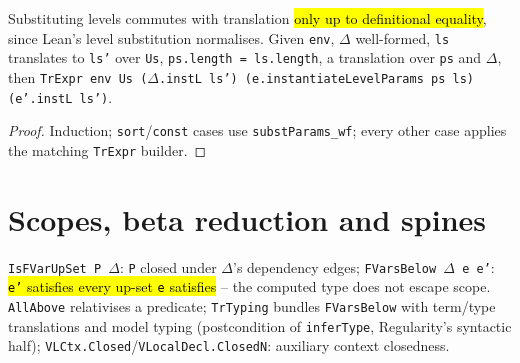\begin{theorem}
\label{thm:trexprs-instl}
\leanok
{}
 Substituting levels commutes with translation \hl{only up to definitional equality}, since Lean's level substitution normalises. Given \texttt{env}, $\Delta$ well-formed, \texttt{ls} translates to \texttt{ls'} over \texttt{Us}, \texttt{ps.length = ls.length}, a translation over \texttt{ps} and $\Delta$, then \texttt{TrExpr env Us ($\Delta$.instL ls') (e.instantiateLevelParams ps ls) (e'.instL ls')}.
\end{theorem}
\begin{proof}
\leanok
{} Induction; \texttt{sort}/\texttt{const} cases use \texttt{substParams\_wf}; every other case applies the matching \texttt{TrExpr} builder.
\end{proof}

\section{Scopes, beta reduction and spines}

\begin{definition}
\label{def:isfvarupset}
\leanok
{}
 \texttt{IsFVarUpSet P $\Delta$}: \texttt{P} closed under $\Delta$'s dependency edges; \texttt{FVarsBelow $\Delta$ e e'}: \hl{\texttt{e'} satisfies every up-set \texttt{e} satisfies} -- the computed type does not escape scope. \texttt{AllAbove} relativises a predicate; \texttt{TrTyping} bundles \texttt{FVarsBelow} with term/type translations and model typing (postcondition of \texttt{inferType}, Regularity's syntactic half); \texttt{VLCtx.Closed}/\texttt{VLocalDecl.ClosedN}: auxiliary context closedness.
\end{definition}

